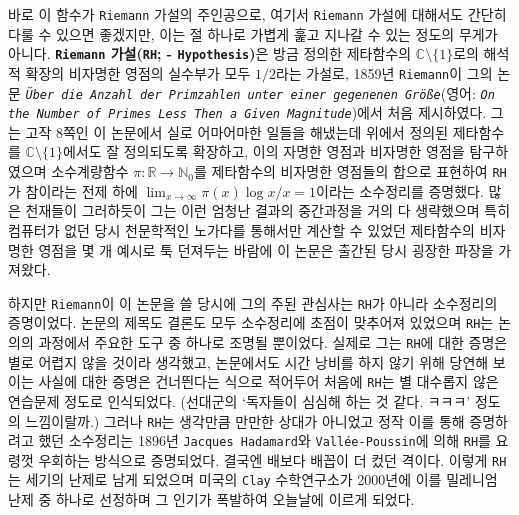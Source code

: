 바로 이 함수가 \texttt{Riemann} 가설의 주인공으로, 여기서 \texttt{Riemann} 가설에 대해서도 간단히 다룰 수 있으면 좋겠지만, 이는 절 하나로 가볍게 훑고 지나갈 수 있는 정도의 무게가 아니다. \textbf{\texttt{Riemann} 가설(\texttt{RH}; - \texttt{Hypothesis})}은 방금 정의한 제타함수의 $\mathbb{C}\setminus\{1\}$로의 해석적 확장의 비자명한 영점의 실수부가 모두 $1/2$라는 가설로, 1859년 \texttt{Riemann}이 그의 논문 \texttt{\textit{\"Uber die Anzahl der Primzahlen unter einer gegenenen Gr\"o\ss e}}(영어: \texttt{\textit{On the Number of Primes Less Then a Given Magnitude}})에서 처음 제시하였다. 그는 고작 8쪽인 이 논문에서 실로 어마어마한 일들을 해냈는데 위에서 정의된 제타함수를 $\mathbb{C}\setminus\{1\}$에서도 잘 정의되도록 확장하고, 이의 자명한 영점과 비자명한 영점을 탐구하였으며 소수계량함수 $\pi:\mathbb{R}\to\mathbb{N}_0$를 제타함수의 비자명한 영점들의 합으로 표현하여 \texttt{RH}가 참이라는 전제 하에 $\lim_{x\to\infty}\pi(x)\log x/x=1$이라는 소수정리를 증명했다. 많은 천재들이 그러하듯이 그는 이런 엄청난 결과의 중간과정을 거의 다 생략했으며 특히 컴퓨터가 없던 당시 천문학적인 노가다를 통해서만 계산할 수 있었던 제타함수의 비자명한 영점을 몇 개 예시로 툭 던져두는 바람에 이 논문은 출간된 당시 굉장한 파장을 가져왔다.

하지만 \texttt{Riemann}이 이 논문을 쓸 당시에 그의 주된 관심사는 \texttt{RH}가 아니라 소수정리의 증명이었다. 논문의 제목도 결론도 모두 소수정리에 초점이 맞추어져 있었으며 \texttt{RH}는 논의의 과정에서 주요한 도구 중 하나로 조명될 뿐이었다. 실제로 그는 \texttt{RH}에 대한 증명은 별로 어렵지 않을 것이라 생각했고, 논문에서도 시간 낭비를 하지 않기 위해 당연해 보이는 사실에 대한 증명은 건너띈다는 식으로 적어두어 처음에 \texttt{RH}는 별 대수롭지 않은 연습문제 정도로 인식되었다. (선대군의 `독자들이 심심해 하는 것 같다. ㅋㅋㅋ' 정도의 느낌이랄까.) 그러나 \texttt{RH}는 생각만큼 만만한 상대가 아니었고 정작 이를 통해 증명하려고 했던 소수정리는 1896년 \texttt{Jacques Hadamard}와 \texttt{Vall\'ee-Poussin}에 의해 \texttt{RH}를 요령껏 우회하는 방식으로 증명되었다. 결국엔 배보다 배꼽이 더 컸던 격이다. 이렇게 \texttt{RH}는 세기의 난제로 남게 되었으며 미국의 \texttt{Clay} 수학연구소가 2000년에 이를 밀레니엄 난제 중 하나로 선정하며 그 인기가 폭발하여 오늘날에 이르게 되었다.

